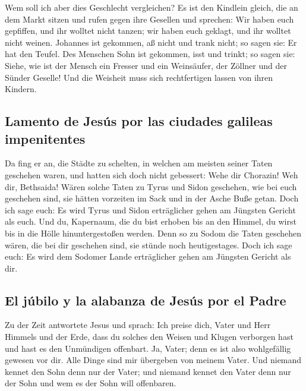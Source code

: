  Wem soll ich aber dies Geschlecht vergleichen? Es ist
den Kindlein gleich, die an dem Markt sitzen und rufen gegen ihre
Gesellen  und sprechen: Wir haben euch gepfiffen, und ihr
wolltet nicht tanzen; wir haben euch geklagt, und ihr wolltet nicht
weinen.  Johannes ist gekommen, aß nicht und trank nicht;
so sagen sie: Er hat den Teufel.  Des Menschen Sohn ist
gekommen, isst und trinkt; so sagen sie: Siehe, wie ist der Mensch ein
Fresser und ein Weinsäufer, der Zöllner und der Sünder Geselle! Und die
Weisheit muss sich rechtfertigen lassen von ihren Kindern.

\hypertarget{lamento-de-jesuxfas-por-las-ciudades-galileas-impenitentes}{%
\subsection{Lamento de Jesús por las ciudades galileas
impenitentes}\label{lamento-de-jesuxfas-por-las-ciudades-galileas-impenitentes}}

 Da fing er an, die Städte zu schelten, in welchen am
meisten seiner Taten geschehen waren, und hatten sich doch nicht
gebessert:  Wehe dir Chorazin! Weh dir, Bethsaida! Wären
solche Taten zu Tyrus und Sidon geschehen, wie bei euch geschehen sind,
sie hätten vorzeiten im Sack und in der Asche Buße getan.
 Doch ich sage euch: Es wird Tyrus und Sidon erträglicher
gehen am Jüngsten Gericht als euch.  Und du, Kapernaum,
die du bist erhoben bis an den Himmel, du wirst bis in die Hölle
hinuntergestoßen werden. Denn so zu Sodom die Taten geschehen wären, die
bei dir geschehen sind, sie stünde noch heutigestages. 
Doch ich sage euch: Es wird dem Sodomer Lande erträglicher gehen am
Jüngsten Gericht als dir.

\hypertarget{el-juxfabilo-y-la-alabanza-de-jesuxfas-por-el-padre}{%
\subsection{El júbilo y la alabanza de Jesús por el
Padre}\label{el-juxfabilo-y-la-alabanza-de-jesuxfas-por-el-padre}}

 Zu der Zeit antwortete Jesus und sprach: Ich preise
dich, Vater und Herr Himmels und der Erde, dass du solches den Weisen
und Klugen verborgen hast und hast es den Unmündigen offenbart.
 Ja, Vater; denn es ist also wohlgefällig gewesen vor
dir.  Alle Dinge sind mir übergeben von meinem Vater. Und
niemand kennet den Sohn denn nur der Vater; und niemand kennet den Vater
denn nur der Sohn und wem es der Sohn will offenbaren.

